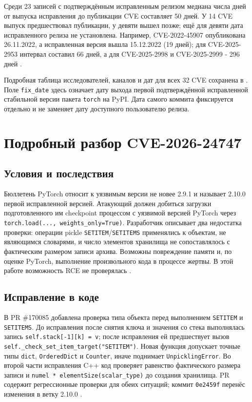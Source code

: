 \documentclass[12pt,a4paper]{report}
\begin{document}
Среди 23 записей с подтверждённым исправленным релизом медиана числа дней от выпуска исправления до публикации CVE составляет 50 дней. У 14 CVE выпуск предшествовал публикации, у девяти вышел позже; ещё для девяти дата исправленного релиза не установлена. Например, CVE-2022-45907 опубликована 26.11.2022, а исправленная версия вышла 15.12.2022 (19 дней); для CVE-2025-2953 интервал составил 66 дней, а для CVE-2025-2998 и CVE-2025-2999 - 296 дней \cite{pypi}.

Подробная таблица исследователей, каналов и дат для всех 32 CVE сохранена в . Поле \texttt{fix\_date} здесь означает дату выхода первой подтверждённой исправленной стабильной версии пакета \texttt{torch} на PyPI. Дата самого коммита фиксируется отдельно и не заменяет дату доступного пользователю релиза.

\section{Подробный разбор CVE-2026-24747}

\subsection{Условия и последствия}

Бюллетень PyTorch относит к уязвимым версии не новее 2.9.1 и называет 2.10.0 первой исправленной версией. Атакующий должен добиться загрузки подготовленного им checkpoint процессом с уязвимой версией PyTorch через \verb|torch.load(..., weights_only=True)|. Разработчик описывает два недостатка проверки: операции pickle \texttt{SETITEM}/\texttt{SETITEMS} применялись к объектам, не являющимся словарями, и число элементов хранилища не сопоставлялось с фактическим размером записи архива. Возможны повреждение памяти и, по оценке PyTorch, выполнение произвольного кода в процессе жертвы. В этой работе возможность RCE не проверялась \cite{ghsa}.

\subsection{Исправление в коде}

В PR \#170085 добавлена проверка типа объекта перед выполнением \texttt{SETITEM} и \texttt{SETITEMS}. До исправления после снятия ключа и значения со стека выполнялась запись \verb|self.stack[-1][k] = v|; после исправления ей предшествует вызов \verb|self._check_set_item_target("SETITEM")|. Новая функция допускает точные типы \texttt{dict}, \texttt{OrderedDict} и \texttt{Counter}, иначе поднимает \texttt{UnpicklingError}. Во второй части исправления C++ код проверяет равенство фактического размера записи и \verb|numel * elementSize(scalar_type)| до создания хранилища. PR содержит регрессионные проверки для обеих ситуаций; коммит \texttt{0e2459f} перенёс изменения в ветку 2.10.0 \cite{fixpr,fixcommit,release}.
\end{document}
